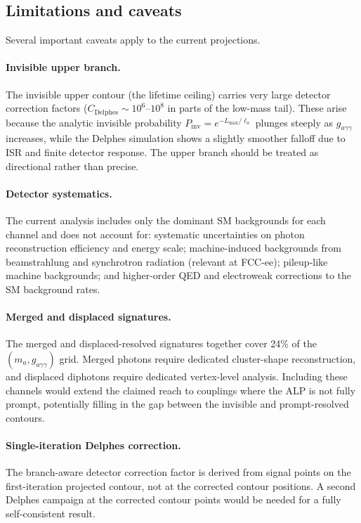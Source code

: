 \documentclass[12pt,a4paper]{article}
\newcommand{\alp}{a}
\newcommand{\gagg}{g_{a\gamma\gamma}}
\begin{document}
\subsection{Limitations and caveats}

Several important caveats apply to the current projections.

\paragraph{Invisible upper branch.}
The invisible upper contour (the lifetime ceiling) carries very large detector
correction factors ($C_\mathrm{Delphes} \sim 10^6$--$10^8$ in parts of the
low-mass tail).
These arise because the analytic invisible probability
$P_\mathrm{inv} = e^{-L_\mathrm{max}/\ell_a}$ plunges steeply as $\gagg$
increases, while the Delphes simulation shows a slightly smoother falloff
due to ISR and finite detector response.
The upper branch should be treated as directional rather than precise.

\paragraph{Detector systematics.}
The current analysis includes only the dominant SM backgrounds for each
channel and does not account for:
systematic uncertainties on photon reconstruction efficiency and energy scale;
machine-induced backgrounds from beamstrahlung and synchrotron radiation
(relevant at FCC-ee);
pileup-like machine backgrounds;
and higher-order QED and electroweak corrections to the SM background rates.

\paragraph{Merged and displaced signatures.}
The merged and displaced-resolved signatures together cover 24\% of the
$(m_\alp, \gagg)$ grid.
Merged photons require dedicated cluster-shape reconstruction, and displaced
diphotons require dedicated vertex-level analysis.
Including these channels would extend the claimed reach to couplings
where the ALP is not fully prompt, potentially filling in the gap between the
invisible and prompt-resolved contours.

\paragraph{Single-iteration Delphes correction.}
The branch-aware detector correction factor is derived from signal points
on the first-iteration projected contour, not at the corrected contour
positions.
A second Delphes campaign at the corrected contour points would be needed for a
fully self-consistent result.
\end{document}
